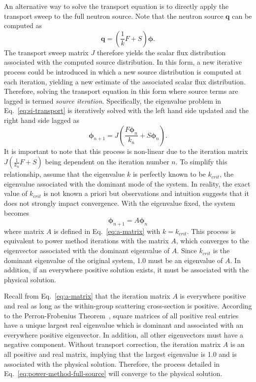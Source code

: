 An alternative way to solve the transport equation is to directly apply the transport sweep to the full neutron source. Note that the neutron source $\mathbf{q}$ can be computed as 
\begin{equation*}
	\mathbf{q} = \left(\frac{1}{k} F + S \right) \boldsymbol{\phi}. 
\end{equation*}
The transport sweep matrix $J$ therefore yields the scalar flux distribution associated with the computed source distribution. In this form, a new iterative process could be introduced in which a new source distribution is computed at each iteration, yielding a new estimate of the associated scalar flux distribution. Therefore, solving the transport equation in this form where source terms are lagged is termed \textit{source iteration}.  Specifically, the eigenvalue problem in Eq.~\ref{eq:si-transport} is iteratively solved with the left hand side updated and the right hand side lagged as
\begin{equation}
	\boldsymbol{\phi}_{n+1} =  J\left(\frac{F\boldsymbol{\phi}_n}{k_n} + S\boldsymbol{\phi}_n\right).
	\label{eq:power-method-full-source}
\end{equation}
It is important to note that this process is non-linear due to the iteration matrix $J\left(\frac{1}{k_n} F + S\right)$ being dependent on the iteration number $n$. To simplify this relationship, assume that the eigenvalue $k$ is perfectly known to be $k_{\textit{crit}}$, the eigenvalue associated with the dominant mode of the system. In reality, the exact value of $k_{\textit{crit}}$ is not known a priori but observations and intuition suggests that it does not strongly impact convergence. With the eigenvalue fixed, the system becomes 
\begin{equation}
	\boldsymbol{\phi}_{n+1} =  A \boldsymbol{\phi}_n
\end{equation}
where matrix $A$ is defined in Eq.~\ref{eq:a-matrix} with $k = k_{\textit{crit}}$. This process is equivalent to power method iterations with the matrix $A$, which converges to the eigenvector associated with the dominant eigenvalue of $A$. Since $k_{\textit{crit}}$ is the dominant eigenvalue of the original system, 1.0 must be an eigenvalue of $A$. In addition, if an everywhere positive solution exists, it must be associated with the physical solution.

Recall from Eq.~\ref{eq:a-matrix} that the iteration matrix $A$ is everywhere positive and real as long as the within-group scattering cross-section is positive. According to the Perron-Frobenius Theorem~\cite{perron-frobenius}, square matrices of all positive real entries have a unique largest real eigenvalue which is dominant and associated with an everywhere positive eigenvector. In addition, all other eigenvectors must have a negative component. Without transport correction, the iteration matrix $A$ is an all positive and real matrix, implying that the largest eigenvalue is 1.0 and is associated with the physical solution. Therefore, the process detailed in Eq.~\ref{eq:power-method-full-source} will converge to the physical solution.

